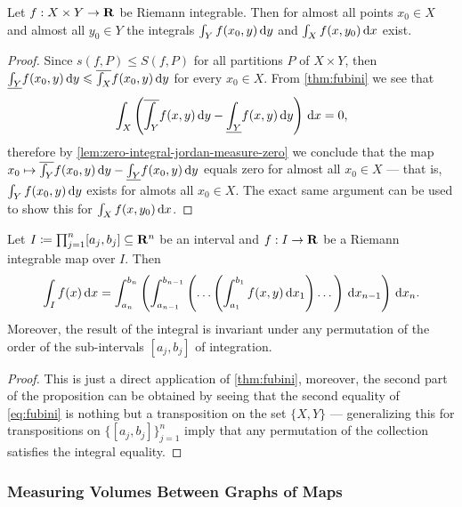 \begin{corollary}
\label{cor:riemann-int-XxY-almost-int-X-and-Y}
Let \(f: X \times Y \to \mathbf{R}\) be Riemann integrable. Then for almost all points
\(x_0 \in X\) and almost all \(y_0 \in Y\) the integrals \(\int_Y f(x_0, y)\,
\mathrm{d} y\) and \(\int_X f(x, y_0)\, \mathrm{d} x\) exist.
\end{corollary}

\begin{proof}
Since \(s(f, P) \leq S(f, P)\) for all partitions \(P\) of \(X \times Y\), then
\(\underline{\int_Y} f(x_0, y)\, \mathrm{d} y \leqslant \overline{\int_X} f(x_0, y)\,
\mathrm{d} y\) for every \(x_0 \in X\). From \cref{thm:fubini} we see that
\[
  \int_X \left( \overline{\int_Y} f(x, y)\, \mathrm{d} y
    - \underline{\int_Y} f(x, y)\, \mathrm{d} y\right)\, \mathrm{d} x = 0,
\]
therefore by \cref{lem:zero-integral-jordan-measure-zero} we conclude that the
map \(x_0 \mapsto \overline{\int_Y} f(x_0, y)\, \mathrm{d} y - \underline{\int_Y}
f(x_0, y)\, \mathrm{d} y\) equals zero for almost all \(x_0 \in X\) --- that is,
\(\int_Y f(x_0, y)\, \mathrm{d} y\) exists for almots all \(x_0 \in X\). The exact
same argument can be used to show this for \(\int_X f(x, y_0)\, \mathrm{d} x\).
\end{proof}

\begin{corollary}
\label{cor:iterated-fubini-theorem}
Let \(I \coloneq \prod_{j = 1}^n [a_j, b_j] \subseteq \mathbf{R}^n\) be an interval and
\(f: I \to \mathbf{R}\) be a Riemann integrable map over \(I\). Then
\[
  \int_I f(x)\, \mathrm{d} x = \int_{a_n}^{b_n} \left(
    \int_{a_{n-1}}^{b_{n-1}} \left(
      \dots \left(
        \int_{a_1}^{b_1} f(x, y)\, \mathrm{d} x_1
      \right)
      \dots \right)\, \mathrm{d} x_{n-1} \right)\, \mathrm{d} x_n.
\]
Moreover, the result of the integral is invariant under any permutation of the
order of the sub-intervals \([a_j, b_j]\) of integration.
\end{corollary}

\begin{proof}
This is just a direct application of \cref{thm:fubini}, moreover, the second
part of the proposition can be obtained by seeing that the second equality of
\cref{eq:fubini} is nothing but a transposition on the set \(\{X, Y\}\) ---
generalizing this for transpositions on \(\{[a_j, b_j]\}_{j=1}^n\) imply that
any permutation of the collection satisfies the integral equality.
\end{proof}

\subsubsection{Measuring Volumes Between Graphs of Maps}

